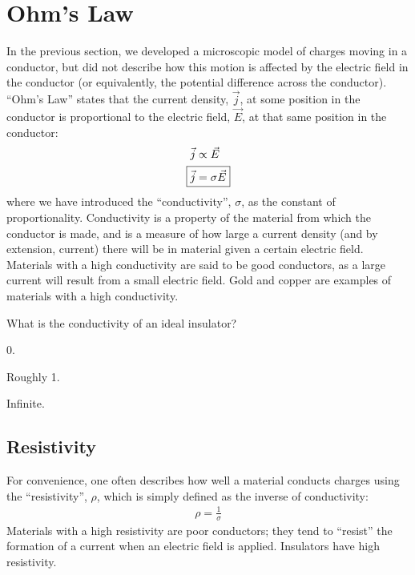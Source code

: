 \section{Ohm's Law}
In the previous section, we developed a microscopic model of charges moving in a conductor, but did not describe how this motion is affected by the electric field in the conductor (or equivalently, the potential difference across the conductor). ``Ohm's Law'' states that the current density, $\vec j$, at some position in the conductor is proportional to the electric field, $\vec E$, at that same position in the conductor:
\begin{align*}
\vec j &\propto \vec E\\
\Aboxed{\vec j &= \sigma \vec E}
\end{align*}
where we have introduced the ``conductivity'', $\sigma$, as the constant of proportionality. Conductivity is a property of the material from which the conductor is made, and is a measure of how large a current density (and by extension, current) there will be in material given a certain electric field. Materials with a high conductivity are said to be good conductors, as a large current will result from a small electric field. Gold and copper are examples of materials with a high conductivity. 

\begin{checkpoint}
	\begin{MCquestion}{What is the conductivity of an ideal insulator?}
		\item 0. \correct
		\item Roughly 1.
		\item Infinite.
	\end{MCquestion}
\end{checkpoint}
 
\subsection{Resistivity}
For convenience, one often describes how well a material conducts charges using the ``resistivity'', $\rho$, which is simply defined as the inverse of conductivity:
\begin{align*}
\rho = \frac{1}{\sigma}
\end{align*}
Materials with a high resistivity are poor conductors; they tend to ``resist'' the formation of a current when an electric field is applied. Insulators have high resistivity.

